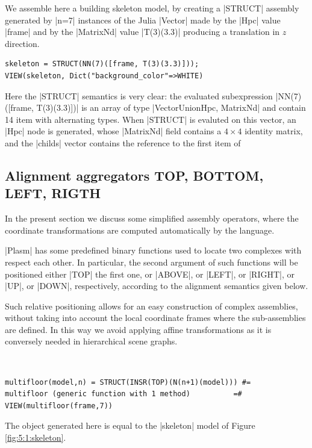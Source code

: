 \begin{coding}\label{5:1:skeleton}
We assemble here a building skeleton model, by creating a |STRUCT| assembly generated by |n=7| instances of the Julia |Vector| made by the |Hpc| value |frame| and by the |MatrixNd| value |T(3)(3.3)| producing a translation in $z$ direction.
\begin{lstlisting}[language=JuliaLocal, style=julia, mathescape=true]
skeleton = STRUCT(NN(7)([frame, T(3)(3.3)]));
VIEW(skeleton, Dict("background_color"=>WHITE)
\end{lstlisting}
\end{coding}

Here the |STRUCT| semantics is very clear: the evaluated subexpression |NN(7)([frame, T(3)(3.3)])| is an array of type |Vector{Union{Hpc, MatrixNd}}| and contain 14 item with alternating types.  When |STRUCT| is evaluted on this vector, an |Hpc| node is generated, whose |MatrixNd| field contains a $4\times 4$ identity matrix, and the |childs| vector contains the reference to the first item of 


\subsection*{Alignment aggregators {\sf TOP, BOTTOM, LEFT, RIGTH}}\label{sect:5-1-1}


In the present section we discuss some simplified assembly operators, where the
coordinate transformations are computed automatically by the language.

|Plasm| has some predefined binary functions used to locate two complexes with respect each other.  In particular,
the second argument of such functions will be positioned either
|TOP| the first one, or |ABOVE|, or |LEFT|, or
|RIGHT|, or |UP|, or |DOWN|, respectively,
according to the alignment semantics given below.

Such relative positioning allows
for an easy construction of complex assemblies, without taking into account the local coordinate frames where the
sub-assemblies are defined.  In this way we avoid applying affine transformations as it is
conversely needed in hierarchical scene graphs.

\begin{coding}\
\begin{lstlisting}[language=JuliaLocal, style=julia, mathescape=true]
multifloor(model,n) = STRUCT(INSR(TOP)(N(n+1)(model))) #=
multifloor (generic function with 1 method)		  	 =#
VIEW(multifloor(frame,7))
\end{lstlisting}
The object generated here is equal to the |skeleton| model of Figure \ref{fig:5:1:skeleton}. 
\end{coding}

